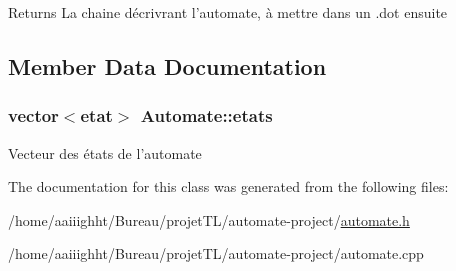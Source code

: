 \begin{DoxyReturn}{Returns}
La chaine décrivrant l'automate, à mettre dans un .dot ensuite 
\end{DoxyReturn}


\subsection{Member Data Documentation}
\hypertarget{class_automate_a8dd5a4e024b8e84834198ac132c3896b}{
\subsubsection[{etats}]{\setlength{\rightskip}{0pt plus 5cm}vector$<${\bf etat}$>$ Automate\-::etats}}\label{class_automate_a8dd5a4e024b8e84834198ac132c3896b}
Vecteur des états de l'automate 

The documentation for this class was generated from the following files\-:\begin{DoxyCompactItemize}
\item 
/home/aaiiighht/\-Bureau/projet\-T\-L/automate-\/project/\hyperlink{automate_8h}{automate.\-h}\item 
/home/aaiiighht/\-Bureau/projet\-T\-L/automate-\/project/automate.\-cpp\end{DoxyCompactItemize}
